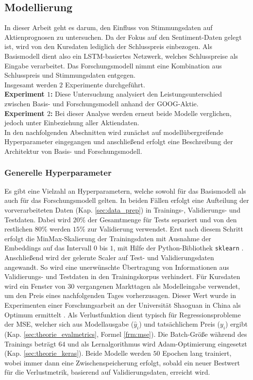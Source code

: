 \newpage
\subsection{Modellierung}\label{sec:modellierung}

In dieser Arbeit geht es darum, den Einfluss von Stimmungsdaten auf Aktienprognosen zu untersuchen. Da der Fokus auf den Sentiment-Daten gelegt ist, wird von den Kursdaten lediglich der Schlusspreis einbezogen. Als Basismodell dient also ein LSTM-basiertes Netzwerk, welches Schlusspreise als Eingabe verarbeitet. Das Forschungsmodell nimmt eine Kombination aus Schlusspreis und Stimmungsdaten entgegen. \\
Insgesamt werden $2$ Experimente durchgeführt. \\
\textbf{Experiment $1$:}    
Diese Untersuchung analysiert den Leistungsunterschied zwischen Basis- und Forschungsmodell anhand der GOOG-Aktie. \\
\textbf{Experiment $2$:}   
Bei dieser Analyse werden erneut beide Modelle verglichen, jedoch unter Einbeziehung aller Aktiendaten. \\
In den nachfolgenden Abschnitten wird zunächst auf modellübergreifende Hyperparameter eingegangen und anschließend erfolgt eine Beschreibung der Architektur von Basis- und Forschungsmodell.

\subsubsection{Generelle Hyperparameter}\label{sec:modellierung_generell_hp}

Es gibt eine Vielzahl an Hyperparametern, welche sowohl für das Basismodell als auch für das Forschungsmodell gelten. 
In beiden Fällen erfolgt eine Aufteilung der vorverarbeiteten Daten (Kap. \ref{sec:data_prep}) in Trainings-, Validierungs- und Testdaten. Dabei wird $20\%$ der Gesamtmenge für Tests separiert und von den restlichen $80\%$ werden $15\%$ zur Validierung verwendet.
Erst nach diesem Schritt erfolgt die MinMax-Skalierung der Trainingsdaten mit Ausnahme der Embeddings auf das Intervall $0$ bis $1$, mit Hilfe der Python-Bibliothek \texttt{sklearn} \autocite{website:ScikitLearn}. Anschließend wird der gelernte Scaler auf Test- und Validierungsdaten angewandt. So wird eine unerwünschte Übertragung von Informationen aus Validierungs- und Testdaten in den Trainingskorpus verhindert. 
Für Kursdaten wird ein Fenster von $30$ vergangenen Markttagen als Modelleingabe verwendet, um den Preis eines nachfolgenden Tages vorherzusagen. Dieser Wert wurde in Experimenten einer Forschungsarbeit an der Universität Shaoguan in China als Optimum ermittelt \autocite[Tabelle 3]{xie2024deep}.
Als Verlustfunktion dient typisch für Regressionsprobleme der \ac{MSE}, welcher sich aus Modellausgabe ($\hat{y}_i$) und tatsächlichem Preis ($y_i$) ergibt (Kap. \ref{sec:theorie_evalmetrics}, Formel \ref{frm:mse}). 
Die Batch-Größe während des Trainings beträgt $64$ und als Lernalgorithmus wird Adam-Optimierung eingesetzt (Kap. \ref{sec:theorie_keras}). 
Beide Modelle werden $50$ Epochen lang trainiert, wobei immer dann eine Zwischenspeicherung erfolgt, sobald ein neuer Bestwert für die Verlustmetrik, basierend auf Validierungsdaten, erreicht wird.


